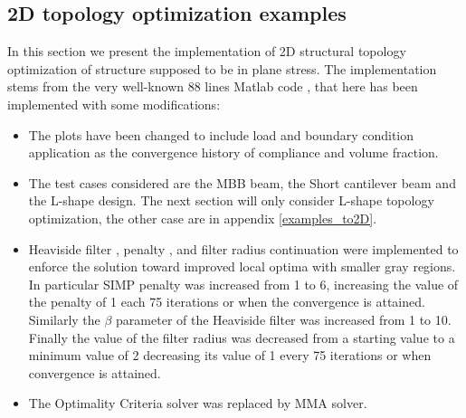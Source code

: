  \subsection{2D topology optimization examples}
In this section we present the implementation of 2D structural topology optimization of structure supposed to be in plane stress. The implementation stems from the very well-known 88 lines Matlab code \cite{andreassen2011efficient}, that here has been implemented with some modifications:
\begin{itemize}
\item The plots have been changed to include load and boundary condition application as the convergence history of compliance and volume fraction. 
\item The test cases considered are the MBB beam, the Short cantilever beam and the L-shape design. The next section will only consider L-shape topology optimization, the other case are in appendix \ref{examples_to2D}.
\item Heaviside filter \cite{guest2004achieving,lazarov2011filters}, penalty \cite{allaire1993numerical,allaire1993topology}, and filter radius \cite{sigmund1997design,sigmund1997designb} continuation were implemented to enforce the solution toward improved local optima with smaller gray regions.
In particular SIMP penalty was increased from 1 to 6, increasing the value of the penalty of 1 each 75 iterations or when the convergence is attained.
Similarly the $\beta$ parameter of the Heaviside filter was increased from 1 to 10.  Finally the value of the filter radius was decreased from a starting value to a minimum value of 2 decreasing its value of 1 every 75 iterations or when convergence is attained.
\item The Optimality Criteria solver was replaced by MMA solver.
\end{itemize}
